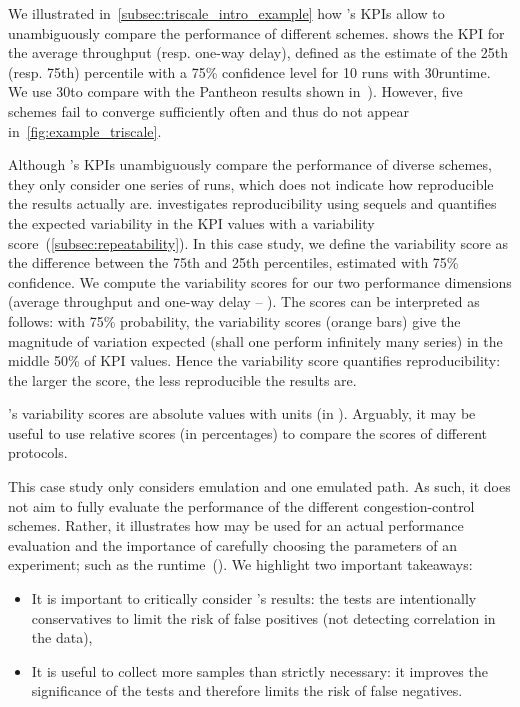 We illustrated in~\cref{subsec:triscale_intro_example} how \triscale's KPIs allow to unambiguously compare the performance of different schemes.
 shows the KPI for the average throughput (resp. one-way delay), defined as the estimate of the 25th (resp. 75th) percentile with a 75\% confidence level for 10 runs with 30\s runtime.
We use 30\s to compare with the Pantheon results shown in~).
However, five schemes fail to converge sufficiently often and thus do not appear in~\cref{fig:example_triscale}.

Although \triscale's KPIs unambiguously compare the performance of diverse schemes, they only consider one series of runs, which does not indicate how reproducible the results actually are.
\triscale investigates reproducibility using sequels and quantifies the expected variability in the KPI values with a variability score~(\cref{subsec:repeatability}).
In this case study, we define the variability score as the difference between the 75th and 25th percentiles, estimated with 75\% confidence.
We compute the variability scores for our two performance dimensions (average throughput and one-way delay -- ).
The scores can be interpreted as follows: with 75\% probability, the variability scores (orange bars) give the magnitude of variation expected (shall one perform infinitely many series) in the middle 50\% of KPI values.
Hence the variability score quantifies reproducibility: the larger the score, the less reproducible the results are.

\begin{remark}
  \triscale's variability scores are absolute values with units (\eg in \mbps). Arguably, it may be useful to use relative scores (in percentages) to compare the scores of different protocols.
\end{remark}

This case study only considers emulation and one emulated path. As such, it does not aim to fully evaluate the performance of the different congestion-control schemes.
Rather, it illustrates how \triscale may be used for an actual performance evaluation and the importance of carefully choosing the parameters of an experiment; such as the runtime~().
We highlight two important takeaways:
\begin{itemize}
  \item It is important to critically consider \triscale's results: the tests are intentionally conservatives to limit the risk of false positives (\eg not detecting correlation in the data),
  \item It is useful to collect more samples than strictly necessary: it improves the significance of the tests and therefore limits the risk of false negatives.
\end{itemize}

